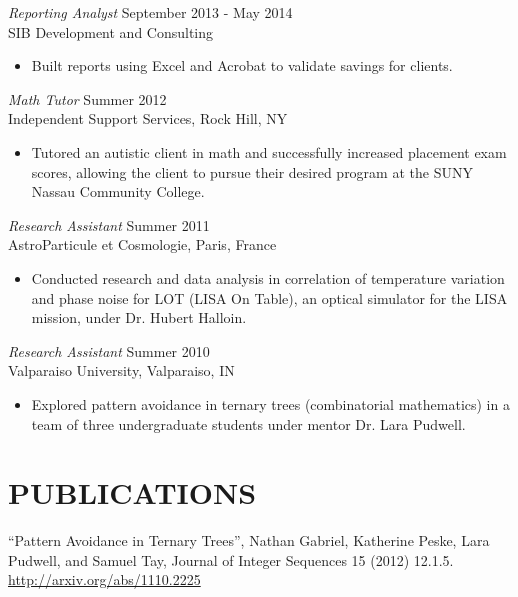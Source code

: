 \documentclass[margin]{res}
\begin{document}
\begin{resume}
  {\sl Reporting Analyst} \hfill            September 2013 - May 2014 \\
  SIB Development and Consulting
  \begin{itemize}  \itemsep -2pt %
    \item Built reports using Excel and Acrobat to validate savings for clients.
  \end{itemize} 

  {\sl Math Tutor} \hfill        Summer 2012 \\
  Independent Support Services, Rock Hill, NY
  \begin{itemize}
    \item Tutored an autistic client in math and successfully increased placement exam
      scores, allowing the client to pursue their desired program at the SUNY Nassau
      Community College.
  \end{itemize} 
 
  {\sl Research Assistant} \hfill        Summer 2011 \\
  AstroParticule et Cosmologie, Paris, France
  \begin{itemize}
    \item Conducted research and data analysis in correlation of temperature variation and
      phase noise for LOT (LISA On Table), an optical simulator for the LISA mission,
      under Dr. Hubert Halloin.
  \end{itemize} 

  {\sl Research Assistant} \hfill        Summer 2010 \\
  Valparaiso University, Valparaiso, IN
  \begin{itemize}
    \item Explored pattern avoidance in ternary trees (combinatorial mathematics) in a
      team of three undergraduate students under mentor Dr. Lara Pudwell.
  \end{itemize} 

\section{PUBLICATIONS}             
  “Pattern Avoidance in Ternary Trees”, Nathan Gabriel, Katherine Peske,
  Lara Pudwell, and Samuel Tay, Journal of Integer Sequences 15 (2012) 12.1.5. \\
  \url{http://arxiv.org/abs/1110.2225}

\end{resume}
\end{document}
